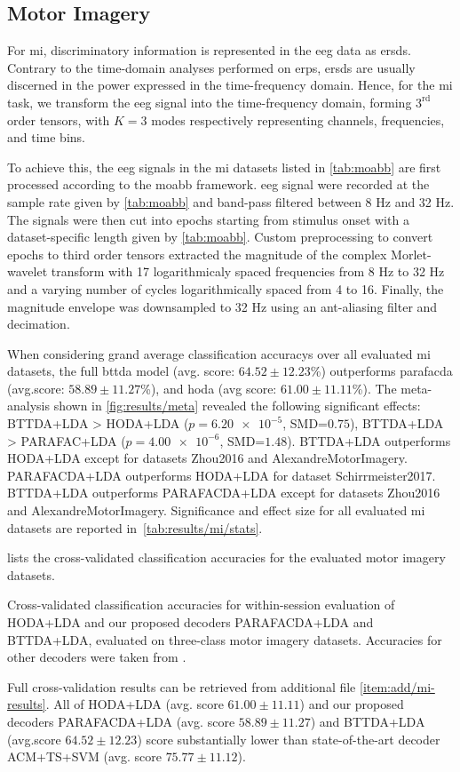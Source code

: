 \documentclass[twocolumn]{article}
\begin{document}
\subsection{Motor Imagery}

For \ac{mi}, discriminatory information is represented in the \ac{eeg} data as
\acp{ersd}.
Contrary to the time-domain analyses performed on \acp{erp}, \acp{ersd} are usually
discerned in the power expressed in the time-frequency domain.
Hence, for the \ac{mi} task, we transform the \ac{eeg} signal into the
time-frequency domain, forming $3^\text{rd}$ order tensors, with $K=3$ modes
respectively representing channels, frequencies, and time bins.

To achieve this, the \ac{eeg} signals in the \ac{mi} datasets listed in \cref{tab:moabb}
are first processed according to the \ac{moabb} framework.
\ac{eeg} signal were recorded at the sample rate given
by \cref{tab:moabb} and band-pass filtered between 8 Hz
and 32 Hz.
The signals were then cut into epochs starting from stimulus onset with a
dataset-specific length given by \cref{tab:moabb}.
Custom preprocessing to convert epochs to third order tensors extracted
the magnitude of the complex Morlet-wavelet transform with 17 logarithmicaly spaced frequencies from 8 Hz to 32 Hz and a varying number of cycles logarithmically spaced from 4 to 16.
Finally, the magnitude envelope was downsampled to 32 Hz using an ant-aliasing filter and decimation.


When considering grand average classification accuracys over all evaluated \ac{mi} datasets,
the full \ac{bttda} model (avg. score: $64.52\pm12.23$\%)
outperforms \ac{parafacda} (avg.score: $58.89\pm11.27$\%), and \ac{hoda}
(avg score: $61.00\pm11.11$\%).
The meta-analysis shown in \cref{fig:results/meta} revealed the following significant effects:
BTTDA+LDA > HODA+LDA ($p=\num{6.20e-5}$, SMD=$0.75$),
BTTDA+LDA > PARAFAC+LDA ($p=\num{4.00e-6}$, SMD=$1.48$).
BTTDA+LDA outperforms HODA+LDA except for datasets Zhou2016 and AlexandreMotorImagery.
PARAFACDA+LDA outperforms HODA+LDA for dataset Schirrmeister2017.
BTTDA+LDA outperforms PARAFACDA+LDA except for datasets Zhou2016 and AlexandreMotorImagery.
Significance and effect size for all evaluated \ac{mi} datasets are reported in~\cref{tab:results/mi/stats}.

 lists the cross-validated classification accuracies for
the evaluated motor imagery datasets.
\begin{sidewaystable*}
	\footnotesize
	
	\caption{Cross-validated classification accuracies for within-session evaluation
		of HODA+LDA and our proposed decoders	PARAFACDA+LDA and BTTDA+LDA,
		evaluated on three-class motor imagery datasets.
		Accuracies for other decoders were taken from \textcite{Chevallier2024}.}%
	\label{tab:mi-score}%
\end{sidewaystable*}
Full cross-validation results can be retrieved from additional file \cref{item:add/mi-results}.
All of HODA+LDA (avg. score $61.00\pm11.11$) and our proposed decoders PARAFACDA+LDA
(avg. score $58.89\pm11.27$) and BTTDA+LDA (avg.score $64.52\pm12.23$) score
substantially lower than state-of-the-art decoder ACM+TS+SVM (avg. score $75.77\pm11.12$).
\end{document}
